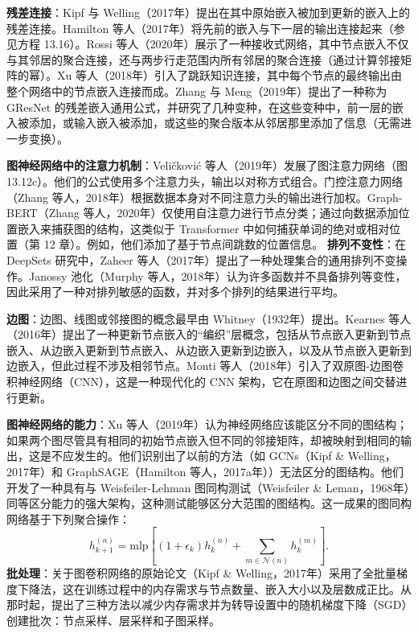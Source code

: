 \documentclass[lang=cn,newtx,10pt,scheme=chinese]{elegantbook}
\begin{document}
\textbf{残差连接}：Kipf 与 Welling（2017年）提出在其中原始嵌入被加到更新的嵌入上的残差连接。Hamilton 等人（2017年）将先前的嵌入与下一层的输出连接起来（参见方程 13.16）。Rossi 等人（2020年）展示了一种接收式网络，其中节点嵌入不仅与其邻居的聚合连接，还与两步行走范围内所有邻居的聚合连接（通过计算邻接矩阵的幂）。Xu 等人（2018年）引入了跳跃知识连接，其中每个节点的最终输出由整个网络中的节点嵌入连接而成。Zhang 与 Meng（2019年）提出了一种称为 GResNet 的残差嵌入通用公式，并研究了几种变种，在这些变种中，前一层的嵌入被添加，或输入嵌入被添加，或这些的聚合版本从邻居那里添加了信息（无需进一步变换）。

\textbf{图神经网络中的注意力机制}：Veličković 等人（2019年）发展了图注意力网络（图 13.12c）。他们的公式使用多个注意力头，输出以对称方式组合。门控注意力网络（Zhang 等人，2018年）根据数据本身对不同注意力头的输出进行加权。Graph-BERT（Zhang 等人，2020年）仅使用自注意力进行节点分类；通过向数据添加位置嵌入来捕获图的结构，这类似于 Transformer 中如何捕获单词的绝对或相对位置（第 12 章）。例如，他们添加了基于节点间跳数的位置信息。
\textbf{排列不变性}：在 DeepSets 研究中，Zaheer 等人（2017年）提出了一种处理集合的通用排列不变操作。Janossy 池化（Murphy 等人，2018年）认为许多函数并不具备排列等变性，因此采用了一种对排列敏感的函数，并对多个排列的结果进行平均。

\textbf{边图}：边图、线图或邻接图的概念最早由 Whitney（1932年）提出。Kearnes 等人（2016年）提出了一种更新节点嵌入的“编织”层概念，包括从节点嵌入更新到节点嵌入、从边嵌入更新到节点嵌入、从边嵌入更新到边嵌入，以及从节点嵌入更新到边嵌入，但此过程不涉及相邻节点。Monti 等人（2018年）引入了双原图-边图卷积神经网络（CNN），这是一种现代化的 CNN 架构，它在原图和边图之间交替进行更新。

\textbf{图神经网络的能力}：Xu 等人（2019年）认为神经网络应该能区分不同的图结构；如果两个图尽管具有相同的初始节点嵌入但不同的邻接矩阵，却被映射到相同的输出，这是不应发生的。他们识别出了以前的方法（如 GCNs（Kipf \& Welling，2017年）和 GraphSAGE（Hamilton 等人，2017a年））无法区分的图结构。他们开发了一种具有与 Weisfeiler-Lehman 图同构测试（Weisfeiler \& Leman，1968年）同等区分能力的强大架构，这种测试能够区分大范围的图结构。这一成果的图同构网络基于下列聚合操作：
\begin{equation}
h^{(n)}_{k+1} = \text{mlp} \left[ \left(1 + \epsilon_k\right) h^{(n)}_k + \sum_{m\in\mathcal{N}(n)} h^{(m)}_k \right]. 
\end{equation}
\textbf{批处理}：关于图卷积网络的原始论文（Kipf \& Welling，2017年）采用了全批量梯度下降法，这在训练过程中的内存需求与节点数量、嵌入大小以及层数成正比。从那时起，提出了三种方法以减少内存需求并为转导设置中的随机梯度下降（SGD）创建批次：节点采样、层采样和子图采样。
\end{document}
